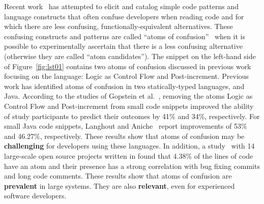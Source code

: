 Recent work~\cite{DBLP:journals/ese/MedeirosLAAKRG19,DBLP:conf/sigsoft/GopsteinIYDZYC17,Langhout:2021:ACJ} has attempted to elicit and catalog simple code patterns and language constructs that often confuse developers when reading code and for which there are less confusing, functionally-equivalent alternatives. These confusing constructs and patterns are called ``atoms of confusion''~\cite{DBLP:conf/sigsoft/GopsteinIYDZYC17} when it is possible to experimentally ascertain that there is a less confusing alternative (otherwise they are called ``atom candidates''). The snippet on the left-hand side of Figure~\ref{fig:lst01} contains two atoms of confusion discussed in previous work~\cite{DBLP:conf/sigsoft/GopsteinIYDZYC17} focusing on the \clang language: Logic as Control Flow and Post-increment. Previous work has identified atoms of confusion in two statically-typed languages, \clang and Java. According to the studies of Gopstein et al.~\cite{DBLP:conf/sigsoft/GopsteinIYDZYC17}, removing the atoms Logic as Control Flow and Post-increment from small \clang code snippets improved the ability of study participants to predict their outcomes by 41\% and 34\%, respectively. For small Java code snippets, Langhout and Aniche~\cite{Langhout:2021:ACJ} report improvements of 53\% and 46.27\%, respectively. These results show that atoms of confusion may be \textbf{challenging} for developers using these languages. In addition, a study~\cite{DBLP:conf/msr/GopsteinZFC18} with 14 large-scale open source projects written in \clang found that 4.38\% of the lines of code have an atom and their presence has a strong correlation with bug fixing commits and long code comments. These results show that atoms of confusion are \textbf{prevalent} in large systems. They are also \textbf{relevant}, even for experienced software developers. 


